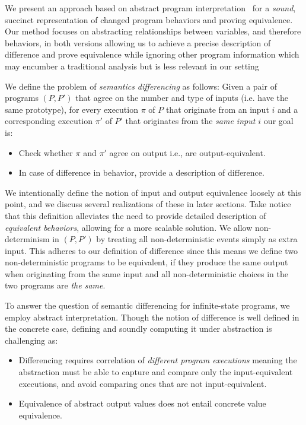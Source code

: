 We present an approach based on abstract program interpretation~\cite{CousotCousot77} for a \emph{sound}, succinct representation of changed program behaviors and proving equivalence. Our method focuses on abstracting relationships between variables, and therefore behaviors, in both versions allowing us to achieve a precise description of difference and prove equivalence while ignoring other program information which may encumber a traditional analysis but is less relevant in our setting

We define the problem of \emph{semantics differencing} as follows: Given a pair of programs $(P,P')$ that agree on the number and type of inputs (i.e. have the same prototype), for every execution $\pi$ of $P$ that originate from an input $i$ and a corresponding execution $\pi'$ of $P'$ that originates from the \emph{same input $i$} our goal is:
\begin{itemize}
\item Check whether $\pi$ and $\pi'$ agree on output i.e., are output-equivalent.
\item In case of difference in behavior, provide a description of difference.
\end{itemize}
We intentionally define the notion of input and output equivalence loosely at this point, and we discuss several realizations of these in later sections. Take notice that this definition alleviates the need to provide detailed description of \emph{equivalent behaviors}, allowing for a more scalable solution.
We allow non-determinism in $(P,P')$ by treating all non-deterministic events simply as extra input. This adheres to our definition of difference since this means we define two non-deterministic programs to be equivalent, if they produce the same output when originating from the same input and all non-deterministic choices in the two programs are \emph{the same}.

To answer the question of semantic differencing for infinite-state programs, we employ abstract interpretation. Though the notion of difference is well defined in the concrete case, defining and soundly computing it under abstraction is challenging as:
\begin{itemize}
\item Differencing requires correlation of \emph{different program executions} meaning the abstraction must be able to capture and compare only the input-equivalent executions, and avoid comparing ones that are not input-equivalent.
\item Equivalence of abstract output values does not entail concrete value equivalence.
\end{itemize}

